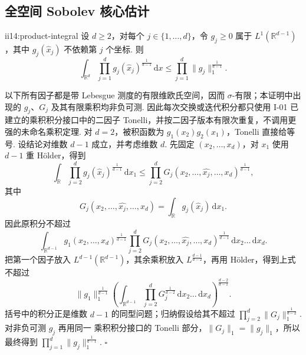 \subsection{全空间 Sobolev 核心估计}

\begin{FALemma}[B][乘积积分引理]{ii14:product-integral}
设 \(\displaystyle d\geqslant2\)，对每个 \(\displaystyle j\in\{1,\dots,d\}\)，令 \(\displaystyle g_j\geqslant0\) 属于 \(\displaystyle L^1(\mathbb R^{d-1})\)，其中 \(\displaystyle g_j(\widehat x_j)\) 不依赖第 \(\displaystyle j\) 个坐标. 则
\[
\int_{\mathbb R^d}
\prod_{j=1}^d g_j(\widehat x_j)^{\frac{1}{d-1}}
\,\mathrm{d}x
\leqslant
\prod_{j=1}^d\|g_j\|_1^{\frac{1}{d-1}}.
\]
\end{FALemma}

\begin{FAProof}
以下所有因子都是带 Lebesgue 测度的有限维欧氏空间，因而 \(\displaystyle\sigma\)-有限；本证明中出现的 \(\displaystyle g_j\)、\(\displaystyle G_j\) 及其有限乘积均非负可测. 因此每次交换或迭代积分都只使用 I-01 已建立的乘积积分接口中的二因子 Tonelli，并按二因子版本有限次重复，不调用更强的未命名乘积定理. 对 \(\displaystyle d=2\)，被积函数为 \(\displaystyle g_1(x_2)g_2(x_1)\)，Tonelli 直接给等号. 设结论对维数 \(\displaystyle d-1\) 成立，并考虑维数 \(\displaystyle d\). 先固定 \(\displaystyle(x_2,\dots,x_d)\)，对 \(\displaystyle x_1\) 使用 \(\displaystyle d-1\) 重 Hölder，得到
\[
\int_{\mathbb R}
\prod_{j=2}^d g_j(\widehat x_j)^{\frac{1}{d-1}}\,\mathrm{d}x_1
\leqslant
\prod_{j=2}^d G_j(x_2,\dots,\widehat{x_j},\dots,x_d)^{\frac{1}{d-1}},
\]
其中
\[
G_j(x_2,\dots,\widehat{x_j},\dots,x_d)
=
\int_{\mathbb R}g_j(\widehat x_j)\,\mathrm{d}x_1.
\]
因此原积分不超过
\[
\int_{\mathbb R^{d-1}}
g_1(x_2,\dots,x_d)^{\frac{1}{d-1}}
\prod_{j=2}^dG_j(x_2,\dots,\widehat{x_j},\dots,x_d)^{\frac{1}{d-1}}
\,\mathrm{d}x_2\dots\,\mathrm{d}x_d.
\]
把第一个因子放入 \(\displaystyle L^{d-1}(\mathbb R^{d-1})\)，其余乘积放入 \(\displaystyle L^{\frac{d-1}{d-2}}\)，再用 Hölder，得到上式不超过
\[
\|g_1\|_1^{\frac{1}{d-1}}
\left(
\int_{\mathbb R^{d-1}}
\prod_{j=2}^dG_j^{\frac{1}{d-2}}
\,\mathrm{d}x_2\dots\,\mathrm{d}x_d
\right)^{\frac{d-2}{d-1}}.
\]
括号中的积分正是维数 \(\displaystyle d-1\) 的同型问题；归纳假设给其不超过 \(\displaystyle\prod_{j=2}^d\|G_j\|_1^{\frac{1}{d-2}}\). 对非负可测 \(\displaystyle g_j\) 再用同一 乘积积分接口的 Tonelli 部分，\(\displaystyle\|G_j\|_1=\|g_j\|_1\)，所以最终得到 \(\displaystyle\prod_{j=1}^d\|g_j\|_1^{\frac{1}{d-1}}\).
\hfill\(\square\)
\end{FAProof}

